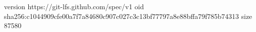 version https://git-lfs.github.com/spec/v1
oid sha256:c1044909cfe00a7f7a84680c907c027c3c13bf77797a8e88bffa79f785b74313
size 87580
